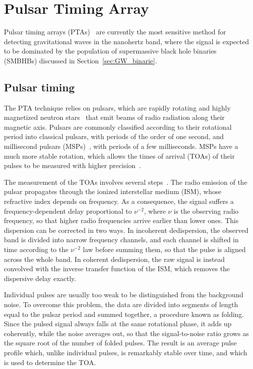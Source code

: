 \chapter{Pulsar Timing Array} \label{chpt:PTA}

Pulsar timing arrays (PTAs)~\cite{Sazhin1978, Detweiler1979, FosterBacker1990} are currently the most sensitive method for detecting
gravitational waves in the nanohertz band, where the signal is expected to be
dominated by the population of supermassive black hole binaries (SMBHBs) discussed
in Section~\ref{sec:GW_binarie}.

\section{Pulsar timing} \label{sec:timing}

The PTA technique relies on pulsars, which are rapidly
rotating and highly magnetized neutron stars~\cite{Hewish1968} that emit beams of radio radiation along
their magnetic axis. Pulsars are commonly classified according to their rotational
period into classical pulsars, with periods of the order of one second, and
millisecond pulsars (MSPs)~\cite{Backer1982}, with periods of a few milliseconds. MSPs have a much more stable rotation, which allows the
times of arrival (TOAs) of their pulses to be measured with higher precision~\cite{LorimerKramer2005}.

The measurement of the TOAs involves several steps~\cite{LorimerKramer2005, Taylor2021}. The radio emission of the
pulsar propagates through the ionized interstellar medium (ISM), whose refractive
index depends on frequency. As a consequence, the signal suffers a
frequency-dependent delay proportional to $\nu^{-2}$, where $\nu$ is the observing
radio frequency, so that higher radio frequencies arrive earlier than
lower ones.
This dispersion can be corrected in two ways. In incoherent dedispersion, the
observed band is divided into narrow frequency channels, and each channel is
shifted in time according to the $\nu^{-2}$ law before summing them, so that the
pulse is aligned across the whole band. In coherent dedispersion, the raw signal
is instead convolved with the inverse transfer function of the ISM, which removes
the dispersive delay exactly.

Individual pulses are usually too weak to be distinguished from the background
noise. To overcome this problem, the data are divided into segments of length
equal to the pulsar period and summed together, a procedure known as folding.
Since the pulsed signal always falls at the same rotational phase, it adds up
coherently, while the noise averages out, so that the signal-to-noise ratio grows
as the square root of the number of folded pulses. The result is an average pulse
profile which, unlike individual pulses, is remarkably stable over time, and which
is used to determine the TOA.

